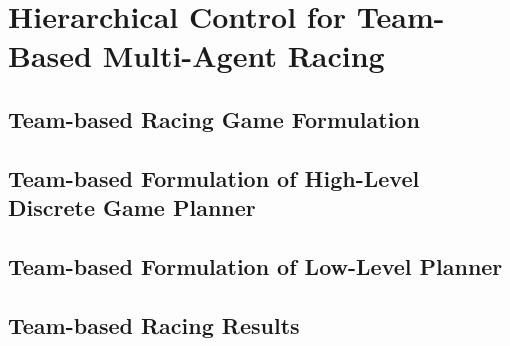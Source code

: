 \chapter{Hierarchical Control for Team-Based Multi-Agent Racing} \label{chapter:team}
\section{Team-based Racing Game Formulation} %
\section{Team-based Formulation of High-Level Discrete Game Planner} %
\section{Team-based Formulation of Low-Level Planner} %
\section{Team-based Racing Results}